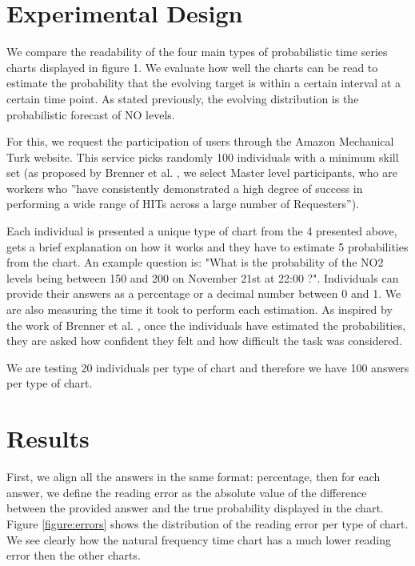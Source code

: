\documentclass[a4paper,3p,sort&compress]{elsarticle}
\begin{document}
\section{Experimental Design}
\label{sec:exp_design}

We compare the readability of the four main types of probabilistic time series charts 
displayed in figure 1. We evaluate how well the charts can be read to estimate the probability 
that the evolving target is within a certain interval at a certain time point. As stated previously, 
the evolving distribution is the probabilistic forecast of NO levels. 

For this, we request the participation of users through the Amazon Mechanical Turk website. 
This service picks randomly 100 individuals with a minimum skill set (as proposed by Brenner 
et al. \cite{brennen_instrument_2018}, we select Master level participants, who are workers who 
''have consistently demonstrated a high degree of success in performing a wide range of HITs across a 
large number of Requesters'').

Each individual is presented a unique type of chart from the 4 presented above, gets a brief 
explanation on how it works and they have to estimate 5 probabilities from the chart. An example question is: 
"What is the probability of the NO2 levels being between 150 and 200 on 
November 21st at 22:00 ?". Individuals can provide their answers as a percentage or a 
decimal number between 0
and 1. We are also measuring the time it took to perform each estimation. 
As inspired by the work of Brenner et 
al. , once the individuals have estimated the probabilities, they are asked how confident they 
felt and how difficult the task was considered.

We are testing 20 individuals per type of chart and therefore we have 100 answers per 
type of chart.

\section{Results}
\label{sec:results}

First, we align all the answers in the same format: percentage, then for each answer, we define the 
reading error as the absolute value of the difference 
between the provided answer and the true probability displayed in the chart. Figure \ref{figure:errors} shows 
the distribution of the reading error per type of chart. We see clearly how the natural frequency time chart
has a much lower reading error then the other charts. 
\end{document}
